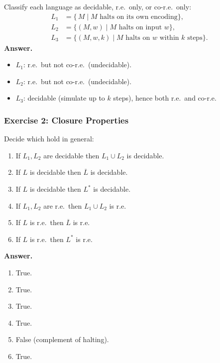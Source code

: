 \documentclass{article}
\theoremstyle{theorem}
\theoremstyle{definition}
\theoremstyle{remark}
\begin{document}
Classify each language as decidable, r.e.\ only, or co-r.e.\ only:
\[
\begin{aligned}
L_1 &= \{\,M \mid M\text{ halts on its own encoding}\},\\
L_2 &= \{(M,w)\mid M\text{ halts on input }w\},\\
L_3 &= \{(M,w,k)\mid M\text{ halts on }w\text{ within }k\text{ steps}\}.
\end{aligned}
\]
\textbf{Answer.}
\begin{itemize}
  \item \(L_1\): r.e.\ but not co-r.e.\ (undecidable).
  \item \(L_2\): r.e.\ but not co-r.e.\ (undecidable).
  \item \(L_3\): decidable (simulate up to \(k\) steps), hence both r.e.\ and co-r.e.
\end{itemize}

\subsubsection*{Exercise 2: Closure Properties}


Decide which hold in general:
\begin{enumerate}
  \item If \(L_1,L_2\) are decidable then \(L_1\cup L_2\) is decidable. %
  \item If \(L\) is decidable then \(\overline L\) is decidable.
  \item If \(L\) is decidable then \(L^*\) is decidable.
  \item If \(L_1,L_2\) are r.e.\ then \(L_1\cup L_2\) is r.e. %
  \item If \(L\) is r.e.\ then \(\overline L\) is r.e.
  \item If \(L\) is r.e.\ then \(L^*\) is r.e.
\end{enumerate}
\textbf{Answer.}
\begin{enumerate} %
  \item True.
  \item True.
  \item True.
  \item True.
  \item False (complement of halting).
  \item True.
\end{enumerate}
\end{document}
